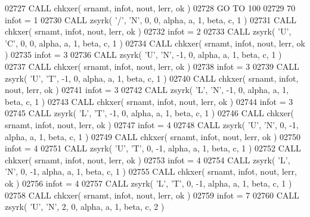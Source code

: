 \begin{DoxyCode}
02727       \textcolor{keyword}{CALL }chkxer( srnamt, infot, nout, lerr, ok )
02728       \textcolor{keywordflow}{GO TO} 100
02729    70 infot = 1
02730       \textcolor{keyword}{CALL }zsyrk( \textcolor{stringliteral}{'/'}, \textcolor{stringliteral}{'N'}, 0, 0, alpha, a, 1, beta, c, 1 )
02731       \textcolor{keyword}{CALL }chkxer( srnamt, infot, nout, lerr, ok )
02732       infot = 2
02733       \textcolor{keyword}{CALL }zsyrk( \textcolor{stringliteral}{'U'}, \textcolor{stringliteral}{'C'}, 0, 0, alpha, a, 1, beta, c, 1 )
02734       \textcolor{keyword}{CALL }chkxer( srnamt, infot, nout, lerr, ok )
02735       infot = 3
02736       \textcolor{keyword}{CALL }zsyrk( \textcolor{stringliteral}{'U'}, \textcolor{stringliteral}{'N'}, -1, 0, alpha, a, 1, beta, c, 1 )
02737       \textcolor{keyword}{CALL }chkxer( srnamt, infot, nout, lerr, ok )
02738       infot = 3
02739       \textcolor{keyword}{CALL }zsyrk( \textcolor{stringliteral}{'U'}, \textcolor{stringliteral}{'T'}, -1, 0, alpha, a, 1, beta, c, 1 )
02740       \textcolor{keyword}{CALL }chkxer( srnamt, infot, nout, lerr, ok )
02741       infot = 3
02742       \textcolor{keyword}{CALL }zsyrk( \textcolor{stringliteral}{'L'}, \textcolor{stringliteral}{'N'}, -1, 0, alpha, a, 1, beta, c, 1 )
02743       \textcolor{keyword}{CALL }chkxer( srnamt, infot, nout, lerr, ok )
02744       infot = 3
02745       \textcolor{keyword}{CALL }zsyrk( \textcolor{stringliteral}{'L'}, \textcolor{stringliteral}{'T'}, -1, 0, alpha, a, 1, beta, c, 1 )
02746       \textcolor{keyword}{CALL }chkxer( srnamt, infot, nout, lerr, ok )
02747       infot = 4
02748       \textcolor{keyword}{CALL }zsyrk( \textcolor{stringliteral}{'U'}, \textcolor{stringliteral}{'N'}, 0, -1, alpha, a, 1, beta, c, 1 )
02749       \textcolor{keyword}{CALL }chkxer( srnamt, infot, nout, lerr, ok )
02750       infot = 4
02751       \textcolor{keyword}{CALL }zsyrk( \textcolor{stringliteral}{'U'}, \textcolor{stringliteral}{'T'}, 0, -1, alpha, a, 1, beta, c, 1 )
02752       \textcolor{keyword}{CALL }chkxer( srnamt, infot, nout, lerr, ok )
02753       infot = 4
02754       \textcolor{keyword}{CALL }zsyrk( \textcolor{stringliteral}{'L'}, \textcolor{stringliteral}{'N'}, 0, -1, alpha, a, 1, beta, c, 1 )
02755       \textcolor{keyword}{CALL }chkxer( srnamt, infot, nout, lerr, ok )
02756       infot = 4
02757       \textcolor{keyword}{CALL }zsyrk( \textcolor{stringliteral}{'L'}, \textcolor{stringliteral}{'T'}, 0, -1, alpha, a, 1, beta, c, 1 )
02758       \textcolor{keyword}{CALL }chkxer( srnamt, infot, nout, lerr, ok )
02759       infot = 7
02760       \textcolor{keyword}{CALL }zsyrk( \textcolor{stringliteral}{'U'}, \textcolor{stringliteral}{'N'}, 2, 0, alpha, a, 1, beta, c, 2 )

\end{DoxyCode}
